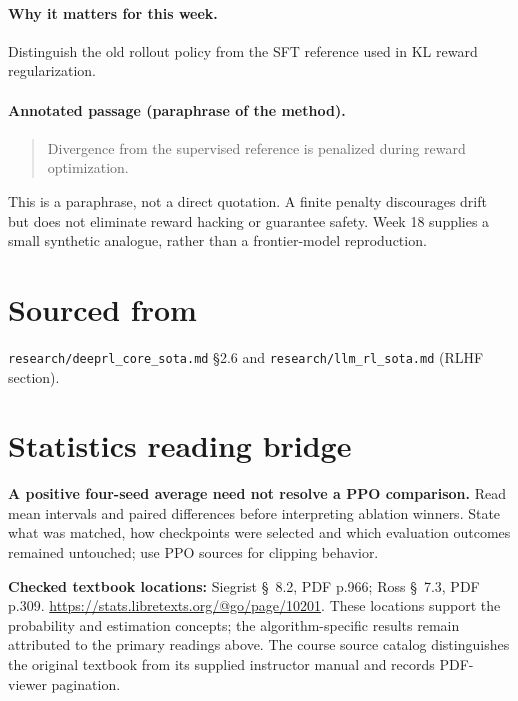 \documentclass[11pt]{scrartcl}
\begin{document}
\paragraph{Why it matters for this week.} Distinguish the old rollout policy from the SFT reference used in KL reward regularization.
\paragraph{Annotated passage (paraphrase of the method).}
\begin{quote}Divergence from the supervised reference is penalized during reward optimization.\end{quote}
This is a paraphrase, not a direct quotation. A finite penalty discourages drift but does not eliminate reward hacking or guarantee safety. Week 18 supplies a small synthetic analogue, rather than a frontier-model reproduction.

\section*{Sourced from}
\texttt{research/deeprl\_core\_sota.md} \S 2.6 and \texttt{research/llm\_rl\_sota.md} (RLHF section).

\section*{Statistics reading bridge}
\textbf{A positive four-seed average need not resolve a PPO comparison.} Read mean intervals and paired differences before interpreting ablation winners. State what was matched, how checkpoints were selected and which evaluation outcomes remained untouched; use PPO sources for clipping behavior.

\textbf{Checked textbook locations:} Siegrist \S~8.2, PDF p.966; Ross \S~7.3, PDF p.309. \url{https://stats.libretexts.org/@go/page/10201}. These locations support the probability and estimation concepts; the algorithm-specific results remain attributed to the primary readings above. The course source catalog distinguishes the original textbook from its supplied instructor manual and records PDF-viewer pagination.
\end{document}
